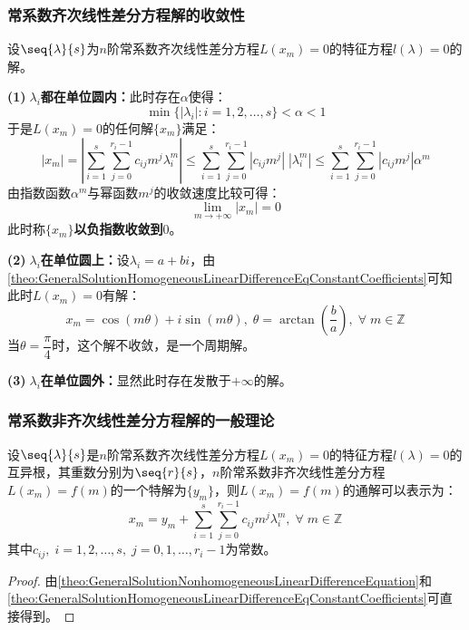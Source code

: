 \subsubsection{常系数齐次线性差分方程解的收敛性}
\begin{derivation}
	设$\seq{\lambda}{s}$为$n$阶常系数齐次线性差分方程$L(x_m)=0$的特征方程$l(\lambda)=0$的解。\par
	\textbf{(1)$\;\lambda_i$都在单位圆内：}此时存在$\alpha$使得：
	\begin{equation*}
		\min\{|\lambda_i|:i=1,2,\dots,s\}<\alpha<1
	\end{equation*}
	于是$L(x_m)=0$的任何解$\{x_m\}$满足：
	\begin{equation*}
		|x_m|=\left|\sum_{i=1}^{s}\sum_{j=0}^{r_i-1}c_{ij}m^{j}\lambda_i^m\right|\leqslant\sum_{i=1}^{s}\sum_{j=0}^{r_i-1}|c_{ij}m^{j}|\;|\lambda_i^m|\leqslant\sum_{i=1}^{s}\sum_{j=0}^{r_i-1}|c_{ij}m^{j}|\alpha^m
	\end{equation*}
	由指数函数$\alpha^m$与幂函数$m^j$的收敛速度比较可得：
	\begin{equation*}
		\lim_{m\to+\infty}|x_m|=0
	\end{equation*}
	此时称$\{x_m\}$\textbf{以负指数收敛到$0$}。\par
	\textbf{(2)$\;\lambda_i$在单位圆上：}设$\lambda_i=a+bi$，由\cref{theo:GeneralSolutionHomogeneousLinearDifferenceEqConstantCoefficients}可知此时$L(x_m)=0$有解：
	\begin{equation*}
		x_m=\cos(m\theta)+i\sin(m\theta),\;\theta=\arctan\left(\frac{b}{a}\right),\;\forall\;m\in\mathbb{Z}^{}
	\end{equation*}
	当$\theta=\dfrac{\pi}{4}$时，这个解不收敛，是一个周期解。\par
	\textbf{(3)$\;\lambda_i$在单位圆外：}显然此时存在发散于$+\infty$的解。
\end{derivation}
\subsubsection{常系数非齐次线性差分方程解的一般理论}
\begin{theorem}\label{theo:GeneralSolutionNonhomogeneousLinearDifferenceEqConstantCoefficients}
	设$\seq{\lambda}{s}$是$n$阶常系数齐次线性差分方程$L(x_m)=0$的特征方程$l(\lambda)=0$的互异根，其重数分别为$\seq{r}{s}$，$n$阶常系数非齐次线性差分方程$L(x_m)=f(m)$的一个特解为$\{y_m\}$，则$L(x_m)=f(m)$的通解可以表示为：
	\begin{equation*}
		x_m=y_m+\sum_{i=1}^{s}\sum_{j=0}^{r_i-1}c_{ij}m^{j}\lambda_i^m,\;\forall\;m\in\mathbb{Z}^{}
	\end{equation*}
	其中$c_{ij},\;i=1,2,\dots,s,\;j=0,1,\dots,r_i-1$为常数。
\end{theorem}
\begin{proof}
	由\cref{theo:GeneralSolutionNonhomogeneousLinearDifferenceEquation}和\cref{theo:GeneralSolutionHomogeneousLinearDifferenceEqConstantCoefficients}可直接得到。
\end{proof}

